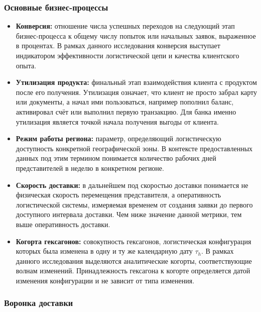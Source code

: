 \documentclass[14pt,a4paper]{extarticle}
\begin{document}
\subsubsection{Основные бизнес-процессы}
\begin{itemize}
    \item \textbf{Конверсия:} отношение числа успешных переходов на следующий этап бизнес-процесса к общему числу попыток или начальных заявок, выраженное в процентах. В рамках данного исследования конверсия выступает индикатором эффективности логистической цепи и качества клиентского опыта.
    \item \textbf{Утилизация продукта:} финальный этап взаимодействия клиента с продуктом после его получения. Утилизация означает, что клиент не просто забрал карту или документы, а начал ими пользоваться, например пополнил баланс, активировал счёт или выполнил первую транзакцию. Для банка именно утилизация является точкой начала получения выгоды от клиента.
    \item \textbf{Режим работы региона:} параметр, определяющий логистическую доступность конкретной географической зоны. В контексте предоставленных данных под этим термином понимается количество рабочих дней представителей в неделю в конкретном регионе.
    \item \textbf{Скорость доставки:} в дальнейшем под скоростью доставки понимается не физическая скорость перемещения представителя, а оперативность логистической системы, измеряемая временем от создания заявки до первого доступного интервала доставки. Чем ниже значение данной метрики, тем выше оперативность доставки.
    \item \textbf{Когорта гексагонов:} совокупность гексагонов, логистическая конфигурация которых была изменена в одну и ту же календарную дату \(\tau_h\). В рамках данного исследования выделяются аналитические когорты, соответствующие волнам изменений. Принадлежность гексагона к когорте определяется датой изменения конфигурации и не зависит от типа изменения.
\end{itemize}

\subsubsection{Воронка доставки}
\end{document}
